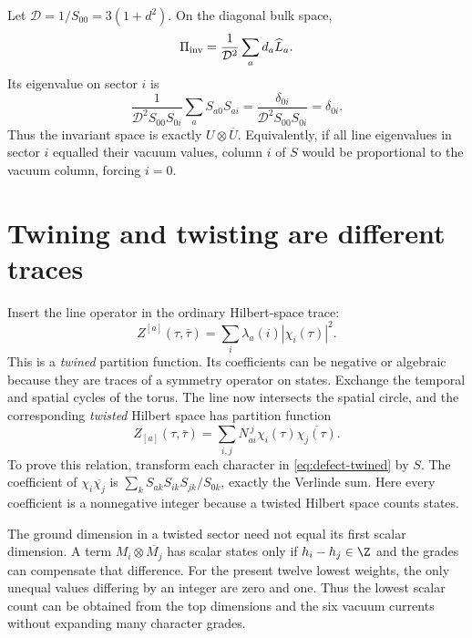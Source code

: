 \begin{example}
Let $\mathcal D=1/S_{00}=3(1+d^2)$. On the diagonal bulk space,
\[
 \Pi_{\rm inv}=\frac1{\mathcal D^2}
                       \sum_a d_a\widehat L_a.
\]
Its eigenvalue on sector $i$ is
\[
 \frac1{\mathcal D^2S_{00}S_{0i}}
          \sum_a S_{a0}S_{ai}
 =\frac{\delta_{0i}}{\mathcal D^2S_{00}S_{0i}}
 =\delta_{0i}.
\]
Thus the invariant space is exactly $U\otimes\overline U$.
Equivalently, if all line eigenvalues in sector $i$ equalled
their vacuum values, column $i$ of $S$ would be proportional to
the vacuum column, forcing $i=0$.
\end{example}

\section{Twining and twisting are different traces}

Insert the line operator in the ordinary Hilbert-space trace:
\begin{equation}
 Z^{[a]}(\tau,\bar\tau)=
 \sum_i\lambda_a(i)|\chi_i(\tau)|^2.
 \label{eq:defect-twined}
\end{equation}
This is a \emph{twined} partition function. Its coefficients can
be negative or algebraic because they are traces of a symmetry
operator on states.
Exchange the temporal and spatial cycles of the torus. The line
now intersects the spatial circle, and the corresponding
\emph{twisted} Hilbert space has partition function
\begin{equation}
 Z_{[a]}(\tau,\bar\tau)=
 \sum_{i,j}N_{ai}^{\ j}\chi_i(\tau)\overline{\chi_j(\tau)}.
 \label{eq:defect-twisted}
\end{equation}
To prove this relation, transform each character in
\eqref{eq:defect-twined} by $S$. The coefficient of
$\chi_i\overline{\chi_j}$ is
$\sum_kS_{ak}S_{ik}S_{jk}/S_{0k}$, exactly the Verlinde sum.
Here every coefficient is a nonnegative integer because a
twisted Hilbert space counts states.

The ground dimension in a twisted sector need not equal its
first scalar dimension. A term
$M_i\otimes\overline{M_j}$ has scalar states only if
$h_i-h_j\in\Z$ and the grades can compensate that difference.
For the present twelve lowest weights, the only unequal values
differing by an integer are zero and one. Thus the lowest scalar
count can be obtained from the top dimensions and the six
vacuum currents without expanding many character grades.

